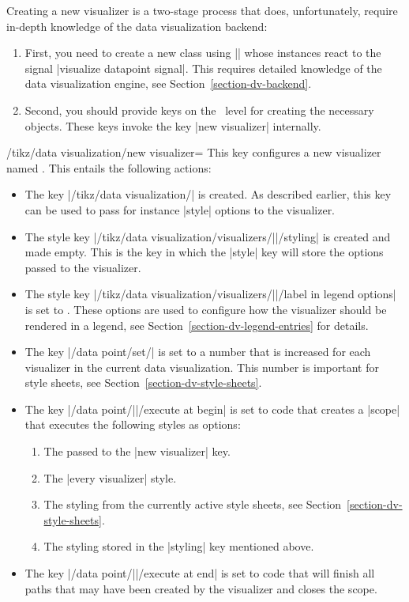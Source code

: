 Creating a new visualizer is a two-stage process that does,
unfortunately, require in-depth knowledge of the data
visualization backend:
\begin{enumerate}
\item First, you need to create a new class using |\pgfooclass| whose
  instances react to the signal |visualize datapoint signal|. This requires
  detailed knowledge of the data visualization engine, see
  Section~\ref{section-dv-backend}.
\item Second, you should provide keys on the \tikzname\ level for
  creating the necessary objects. These keys invoke the key
  |new visualizer| internally.
\end{enumerate}

\begin{key}{/tikz/data visualization/new
    visualizer=}
  This key configures a new visualizer named . This entails
  the following actions:
  \begin{itemize}
  \item The key |/tikz/data visualization/| is
    created. As described earlier, this key can be used to pass
    for instance |style| options to the visualizer.
  \item The style key |/tikz/data visualization/visualizers/||/styling|
    is created and made empty. This is the key in which the |style|
    key will store the options passed to the visualizer.
  \item The style key |/tikz/data visualization/visualizers/||/label in legend options|
    is set to . These options are used to
    configure how the visualizer should be rendered in a legend, see
    Section~\ref{section-dv-legend-entries} for details.
  \item The key |/data point/set/| is set to a
    number that is increased for each visualizer in the current data
    visualization. This number is important for style sheets, see
    Section~\ref{section-dv-style-sheets}.
  \item The key |/data point/||/execute at begin| is set to
    code that creates a |{scope}| that executes the following styles
    as options:
    \begin{enumerate}
    \item The  passed to the |new visualizer| key.
    \item The |every visualizer| style.
    \item The styling from the currently active style sheets, see
      Section~\ref{section-dv-style-sheets}. 
    \item The styling stored in the |styling| key mentioned above.
    \end{enumerate}
  \item The key |/data point/||/execute at end| is set to
    code that will finish all paths that may have been created by the
    visualizer and closes the scope.
  \end{itemize}
  

\end{key}
